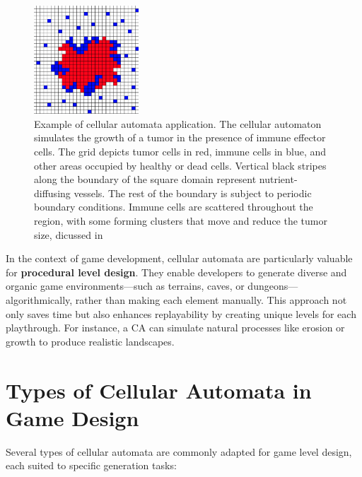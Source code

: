 \documentclass{article}
\begin{document}
\begin{figure}[h!]
    \centering
    \includegraphics[width=0.35\textwidth]{projects/game_level_design/images/ca_tumor.png}
    \caption{Example of cellular automata application. The cellular automaton simulates the growth of a tumor in the presence of immune effector cells. The grid depicts tumor cells in red, immune cells in blue, and other areas occupied by healthy or dead cells. Vertical black stripes along the boundary of the square domain represent nutrient-diffusing vessels. The rest of the boundary is subject to periodic boundary conditions. Immune cells are scattered throughout the region, with some forming clusters that move and reduce the tumor size, dicussed in  \textcite{Lpez2017_game_level}}
\end{figure}


In the context of game development, cellular automata are particularly valuable for \textbf{procedural level design}. They enable developers to generate diverse and organic game environments—such as terrains, caves, or dungeons—algorithmically, rather than making each element manually. This approach not only saves time but also enhances replayability by creating unique levels for each playthrough. For instance, a CA can simulate natural processes like erosion or growth to produce realistic landscapes. 




\section{Types of Cellular Automata in Game Design}

Several types of cellular automata are commonly adapted for game level design, each suited to specific generation tasks:
\end{document}
